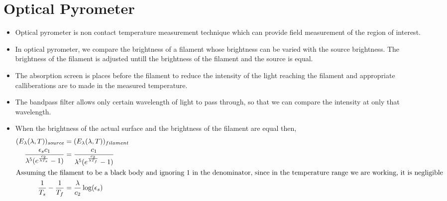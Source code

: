 \documentclass{article}
\begin{document}
\section{Optical Pyrometer}
	\begin{itemize}
		\item Optical pyrometer is non contact temperature measurement technique which can provide field measurement of the region of interest. 
		\item In optical pyrometer, we compare the brightness of a filament whose brightness can be varied with the source brightness. The brightness of the filament is adjusted untill the brightness of the filament and the source is equal. 
		\item The absorption screen is places before the filament to reduce the intensity of the light reaching the filament and appropriate calliberations are to made in the measured temperature.
		\item The bandpass filter allows only certain wavelength of light to pass through, so that we can compare the intensity at only that wavelength.
		\item When the brightness of the actual surface and the brightness of the filament are equal then,
		\begin{align*}
			(E_{\lambda}(\lambda, T))_{source} &= (E_{\lambda}(\lambda, T))_{filament}\\
			\frac{\epsilon_s c_1}{\lambda^5 (e^{\frac{c_2}{\lambda T_s}}-1)} &= \frac{c_1}{\lambda^5 (e^{\frac{c_2}{\lambda T_f}}-1)}\\
			\intertext{Assuming the filament to be a black body and ignoring 1 in the denominator, since in the temperature range we are working, it is negligible}
			\frac{1}{T_s}-\frac{1}{T_f} &= \frac{\lambda }{c_2}\log(\epsilon_s)
		\end{align*} 

	\end{itemize}
\end{document}
